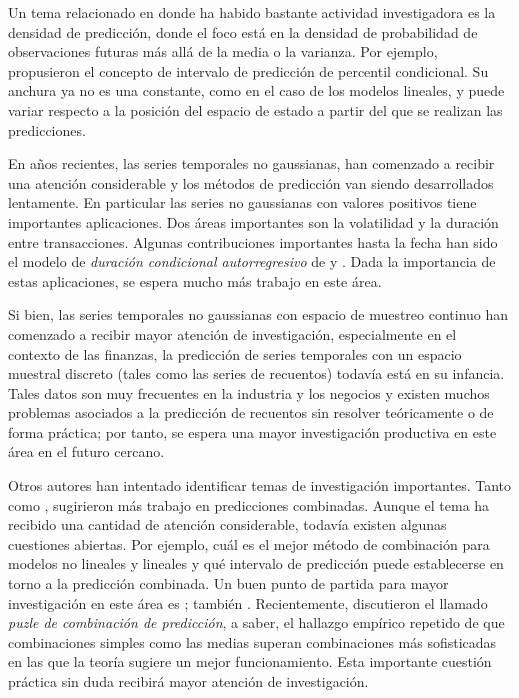 \documentclass{llncs}
\begin{document}
Un tema relacionado en donde ha habido bastante actividad investigadora es la densidad de predicción, donde el foco está en la densidad de probabilidad de observaciones futuras más allá de la media o la varianza. Por ejemplo, \cite{Yao1995395} propusieron el concepto de intervalo de predicción de percentil condicional. Su anchura ya no es una constante, como en el caso de los modelos lineales, y puede variar respecto a la posición del espacio de estado a partir del que se realizan las predicciones.

En años recientes, las series temporales no gaussianas, han comenzado a recibir una atención considerable y los métodos de predicción van siendo desarrollados lentamente. En particular las series no gaussianas con valores positivos tiene importantes aplicaciones. Dos áreas importantes son la volatilidad y la duración entre transacciones. Algunas contribuciones importantes hasta la fecha han sido el modelo de \emph{duración condicional autorregresivo} de \cite{Engle19981127} y  \cite{Andersen2003579}. Dada la importancia de estas aplicaciones, se espera mucho más trabajo en este área.

Si bien, las series temporales no gaussianas con espacio de muestreo continuo han comenzado a recibir mayor atención de investigación, especialmente en el contexto de las  finanzas, la predicción de series temporales con un espacio muestral discreto (tales como las series de recuentos) todavía está en su infancia. Tales datos son muy frecuentes en la industria y los negocios y existen muchos problemas asociados a la predicción de recuentos sin resolver teóricamente o de forma práctica; por tanto, se espera una mayor investigación productiva en este área en el futuro cercano.

Otros autores han intentado identificar temas de investigación importantes. Tanto \cite{deGooijer1990449} como \cite{Clements20031}, sugirieron más trabajo en predicciones combinadas. Aunque el tema ha recibido una cantidad de atención considerable, todavía existen algunas cuestiones abiertas. Por ejemplo, cuál es el mejor método de combinación para modelos no lineales y lineales y qué intervalo de predicción puede establecerse en torno a la predicción combinada. Un buen punto de partida para mayor investigación en este área es \cite{Terasvirta2006}; también \cite{Armstrong2001}. Recientemente, \cite{Stock2004405} discutieron el llamado \emph{puzle de combinación de predicción}, a saber, el hallazgo empírico repetido de que combinaciones simples como las medias superan combinaciones más sofisticadas en las que la teoría sugiere un mejor funcionamiento. Esta importante cuestión práctica sin duda recibirá mayor atención de investigación.
\end{document}
